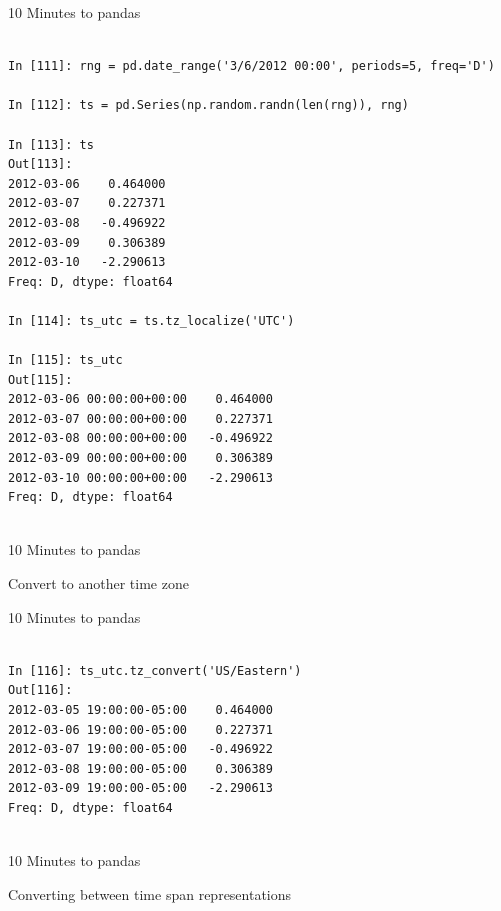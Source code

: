\documentclass{beamer}
\begin{document}
\begin{frame}[t,fragile]{10 Minutes to pandas}


	\scriptsize
\begin{verbatim}

In [111]: rng = pd.date_range('3/6/2012 00:00', periods=5, freq='D')

In [112]: ts = pd.Series(np.random.randn(len(rng)), rng)

In [113]: ts
Out[113]: 
2012-03-06    0.464000
2012-03-07    0.227371
2012-03-08   -0.496922
2012-03-09    0.306389
2012-03-10   -2.290613
Freq: D, dtype: float64

In [114]: ts_utc = ts.tz_localize('UTC')

In [115]: ts_utc
Out[115]: 
2012-03-06 00:00:00+00:00    0.464000
2012-03-07 00:00:00+00:00    0.227371
2012-03-08 00:00:00+00:00   -0.496922
2012-03-09 00:00:00+00:00    0.306389
2012-03-10 00:00:00+00:00   -2.290613
Freq: D, dtype: float64


\end{verbatim}


\end{frame}


\begin{frame}[t]{10 Minutes to pandas}

Convert to another time zone

\end{frame}


\begin{frame}[t,fragile]{10 Minutes to pandas}


	\scriptsize
\begin{verbatim}

In [116]: ts_utc.tz_convert('US/Eastern')
Out[116]: 
2012-03-05 19:00:00-05:00    0.464000
2012-03-06 19:00:00-05:00    0.227371
2012-03-07 19:00:00-05:00   -0.496922
2012-03-08 19:00:00-05:00    0.306389
2012-03-09 19:00:00-05:00   -2.290613
Freq: D, dtype: float64


\end{verbatim}


\end{frame}


\begin{frame}[t]{10 Minutes to pandas}

Converting between time span representations

\end{frame}
\end{document}
